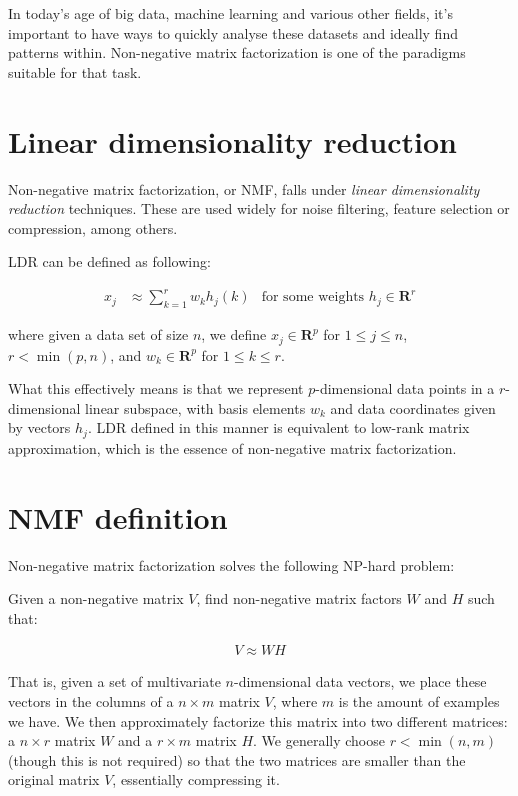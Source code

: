 In today's age of big data, machine learning and various other fields, it's important to have ways to quickly analyse these datasets and ideally find patterns within. Non-negative matrix factorization is one of the paradigms suitable for that task.

\section{Linear dimensionality reduction}
Non-negative matrix factorization, or NMF, falls under \emph{linear dimensionality reduction} techniques. These are used widely for noise filtering, feature selection or compression, among others.

LDR can be defined as following: \cite{nmf_why_how}

\begin{align}
x_j &\approx \sum_{k=1}^{r}w_kh_j(k) &\text{for some weights $h_j \in \mathbf{R}^r$}
\end{align}

where given a data set of size $n$, we define $x_j \in \mathbf{R}^p$ for $1 \leq j \leq n$, $r < \min(p,n)$, and $w_k \in \mathbf{R}^p$ for $1 \leq k \leq r$.

What this effectively means is that we represent $p$-dimensional data points in a $r$-dimensional linear subspace, with basis elements $w_k$ and data coordinates given by vectors $h_j$. LDR defined in this manner is equivalent to low-rank matrix approximation, which is the essence of non-negative matrix factorization.

\section{NMF definition}
Non-negative matrix factorization solves the following NP-hard problem:

Given a non-negative matrix $V$, find non-negative matrix factors $W$ and $H$ such that:

\begin{align}
V \approx WH
\end{align}

That is, given a set of multivariate $n$-dimensional data vectors, we place these vectors in the columns of a $n \times m$ matrix $V$, where $m$ is the amount of examples we have. We then approximately factorize this matrix into two different matrices: a $n \times r$ matrix $W$ and a $r \times m$ matrix $H$. We generally choose $r < \min(n,m)$ (though this is not required) so that the two matrices are smaller than the original matrix $V$, essentially compressing it. \cite{nmf_algorithms}

